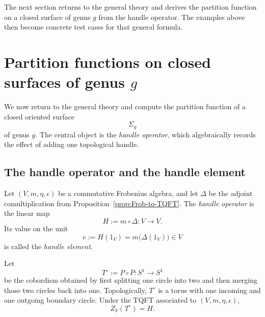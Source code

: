 \medskip

\noindent The next section returns to the general theory and derives the partition function on a closed surface of genus $g$ from the handle operator. The examples above then become concrete test cases for that general formula.

\section{Partition functions on closed surfaces of genus \texorpdfstring{$g$}{g}}\label{sec:genus-g-partition}

We now return to the general theory and compute the partition function of a closed oriented surface
\begin{equation}\label{eq:Sigma-g}
\Sigma_g
\end{equation}
of genus $g$. The central object is the \emph{handle operator}, which algebraically records the effect of adding one topological handle.

\subsection{The handle operator and the handle element}

\begin{definition}\label{def:handle-operator}
Let $(V,m,\eta,\epsilon)$ be a commutative Frobenius algebra, and let $\Delta$ be the adjoint comultiplication from Proposition~\ref{prop:Frob-to-TQFT}. The \emph{handle operator} is the linear map
\begin{equation}\label{eq:handle-operator}
H := m \circ \Delta : V \longrightarrow V.
\end{equation}
Its value on the unit
\begin{equation}\label{eq:handle-element}
e := H(1_V) = m\bigl(\Delta(1_V)\bigr) \in V
\end{equation}
is called the \emph{handle element}.
\end{definition}

\begin{proposition}\label{prop:punctured-torus-handle}
Let
\begin{equation}\label{eq:punctured-torus-cobordism}
T^\circ := P \circ \overline{P} : S^1 \longrightarrow S^1
\end{equation}
be the cobordism obtained by first splitting one circle into two and then merging those two circles back into one. Topologically, $T^\circ$ is a torus with one incoming and one outgoing boundary circle. Under the TQFT associated to $(V,m,\eta,\epsilon)$,
\begin{equation}\label{eq:punctured-torus-map}
Z_V(T^\circ)=H.
\end{equation}
\end{proposition}

